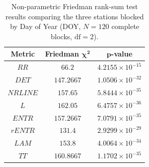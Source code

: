 \vspace{-3pt}
\begin{table}[H]
\caption{Non-parametric Friedman rank-sum test results comparing the three stations blocked by Day of Year (DOY, $N = 120$ complete blocks, $\text{df} = 2$).\label{tab:friedman_results}}
\begin{tabularx}{\textwidth}{CCC}
\toprule
\textbf{Metric} & \textbf{Friedman} $\boldsymbol{\chi^2}$ & $\boldsymbol{p}$\textbf{-value} \\
\midrule
$RR$ & $66.2$ & $4.2155 \times 10^{-15}$ \\
$DET$ & $147.2667$ & $1.0506 \times 10^{-32}$ \\
$NRLINE$ & $157.65$ & $5.8444 \times 10^{-35}$ \\
$L$ & $162.05$ & $6.4757 \times 10^{-36}$ \\
$ENTR$ & $157.2667$ & $7.0791 \times 10^{-35}$ \\
$rENTR$ & $131.4$ & $2.9299 \times 10^{-29}$ \\
$LAM$ & $153.8$ & $4.0064 \times 10^{-34}$ \\
$TT$ & $160.8667$ & $1.1702 \times 10^{-35}$ \\
\bottomrule
\end{tabularx}
\end{table}
\vspace{-3pt}
